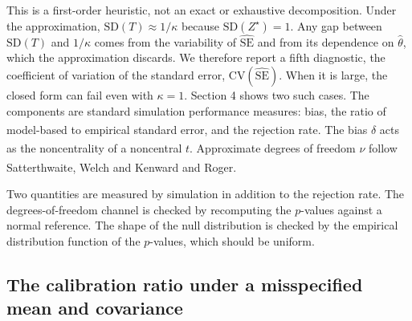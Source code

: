 \documentclass[
  11pt,
]{article}
\begin{document}
This is a first-order heuristic, not an exact or exhaustive
decomposition. Under the approximation, \(\mathrm{SD}(T) \approx
1/\kappa\) because \(\mathrm{SD}(Z^{\star}) = 1\). Any gap between
\(\mathrm{SD}(T)\) and \(1/\kappa\) comes from the variability of
\(\widehat{\mathrm{SE}}\) and from its dependence on \(\hat\theta\), which
the approximation discards. We therefore report a fifth diagnostic,
the coefficient of variation of the standard error,
\(\mathrm{CV}(\widehat{\mathrm{SE}})\). When it is large, the closed
form can fail even with \(\kappa = 1\). Section 4 shows two such cases.
The components are standard simulation performance measures: bias,
the ratio of model-based to empirical standard error, and the
rejection rate\textsuperscript{}. The bias \(\delta\) acts as the
noncentrality of a noncentral \(t\)\textsuperscript{}.
Approximate degrees of freedom \(\nu\) follow Satterthwaite\textsuperscript{}, Welch\textsuperscript{} and Kenward
and Roger\textsuperscript{}.

Two quantities are measured by simulation in addition to the rejection
rate. The degrees-of-freedom channel is checked by recomputing the
\(p\)-values against a normal reference. The shape of the null
distribution is checked by the empirical distribution function of the
\(p\)-values, which should be uniform.

\subsection{The calibration ratio under a misspecified mean and covariance}\label{the-calibration-ratio-under-a-misspecified-mean-and-covariance}
\end{document}
